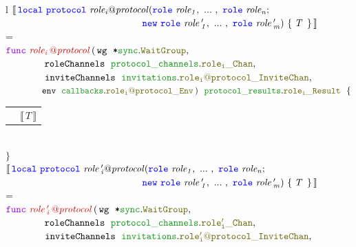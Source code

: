 \documentclass[12pt,twoside]{report}
\begin{document}
\begin{figure}[!h]
    \begin{center}
        \begin{tabular}{l}
            $\llbracket\,\scrlocal\ \protocol\ \mathit{\localprotocol{role_i}{protocol}}(\rolessig{role}{n};$\\
            $\qquad \qquad \qquad \qquad \qquad \qquad \qquad\, \scrnew\ \rolessig{role\,'}{m})\ \{\;\mathit{T}\;\,\}\,\rrbracket$ =\\[10pt]
            
            $\gofunc\ \functionname{\localprotocol{role_i\,}{protocol}}\,(\,\wg\;\ \texttt{*}\waitgroup,$\\

            $\qquad \qquad \rolechannels\;\ \rolechantype{role_i}{protocol},$\\

            $\qquad \qquad \invitechannels\;\ \invitechantype{role_i}{protocol},$\\
            
            $\qquad \qquad \envparam\;\ \envtype{role_i}{protocol}\,)\ \ \resulttype{role_i}{protocol}\ \ \{$\\[3pt]
            
            \begin{tabular}{ll}
                \indent & $\llbracket \, T \, \rrbracket$
            \end{tabular}\\[3pt]

            $\}$\\[30pt]
            
            $\llbracket\,\scrlocal\ \protocol\ \mathit{\localprotocol{role\,'_i}{protocol}}(\rolessig{role}{n};$\\
            $\qquad \qquad \qquad \qquad \qquad \qquad \qquad\, \scrnew\ \rolessig{role\,'}{m})\ \{\;\mathit{T}\;\,\}\,\rrbracket$ =\\[10pt]
            
            $\gofunc\ \functionname{\localprotocol{role\,'_i\,}{protocol}}\,(\,\wg\;\ \texttt{*}\waitgroup,$\\

            $\qquad \qquad \rolechannels\;\ \rolechantype{role'_i}{protocol},$\\

            $\qquad \qquad \invitechannels\;\ \invitechantype{role'_i}{protocol},$\\
            

\end{tabular}
\end{center}
\end{figure}
\end{document}
